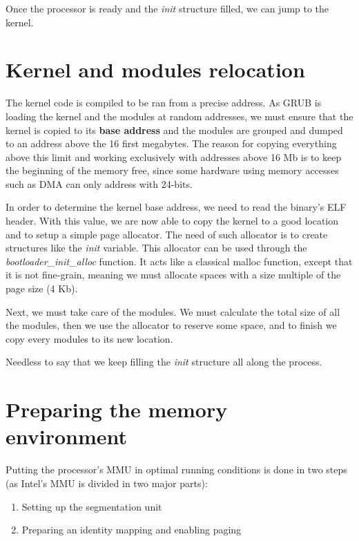 Once the processor is ready and the \textit{init} structure filled, we
can jump to the kernel.

%
%

\section{Kernel and modules relocation}

The kernel code is compiled to be ran from a precise address. As GRUB
is loading the kernel and the modules at random addresses, we must
ensure that the kernel is copied to its \textbf{base address} and the
modules are grouped and dumped to an address above the 16 first
megabytes. The reason for copying everything above this limit and
working exclusively with addresses above 16 Mb is to keep the
beginning of the memory free, since some hardware using memory
accesses such as DMA can only address with 24-bits.

In order to determine the kernel base address, we need to read the
binary's ELF header. With this value, we are now able to copy the
kernel to a good location and to setup a simple page allocator. The
need of such allocator is to create structures like the \textit{init}
variable. This allocator can be used through the
\textit{bootloader\_init\_alloc} function. It acts like a classical
malloc function, except that it is not fine-grain, meaning we must
allocate spaces with a size multiple of the page size (4 Kb).

Next, we must take care of the modules. We must calculate the total
size of all the modules, then we use the allocator to reserve some
space, and to finish we copy every modules to its new location.

Needless to say that we keep filling the \textit{init} structure all
along the process.

%
%

\section{Preparing the memory environment}

Putting the processor's  MMU in optimal running conditions  is done in
two steps (as Intel's MMU is divided in two major parts):

\begin{enumerate}
  \item Setting up the segmentation unit
  \item Preparing an identity mapping and enabling paging
\end{enumerate}

